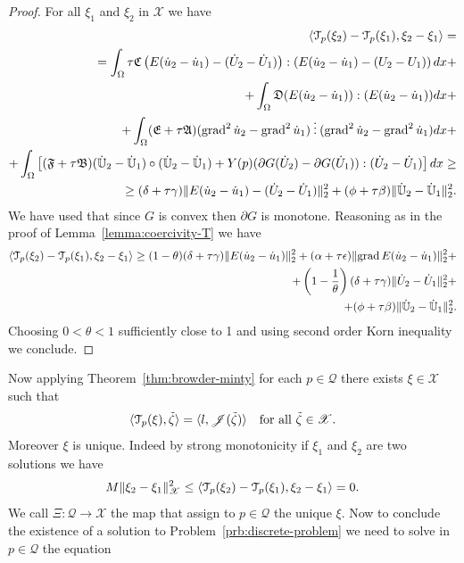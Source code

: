 \begin{proof}
For all $\xi_1$ and $\xi_2$ in $\mathscr{X}$ we have
\[
\begin{split}
\langle\mathcal{T}_p(\xi_2)-\mathcal{T}_p(\xi_1),\xi_2-\xi_1\rangle=\\
=\int_\Omega\tau\mathfrak{C}\left(E(\dot u_2-\dot u_1)-(\dot U_2-\dot U_1)\right):\left(E(\dot u_2-\dot u_1)-(U_2-U_1)\right)dx+\\
+\int_\Omega\mathfrak{D}(E(\dot u_2-\dot u_1)):(E(\dot u_2-\dot u_1))dx+\\
+\int_\Omega(\mathfrak{E}+\tau \mathfrak{A})(\operatorname{grad}^2\dot u_2-\operatorname{grad}^2\dot u_1)\mathbin{\vdots}(\operatorname{grad}^2\dot u_2-\operatorname{grad}^2\dot u_1)dx+\\
+\int_\Omega\left[(\mathfrak{F}+\tau\mathfrak{B})(\mathbb{\dot U}_2-\mathbb{\dot U}_1)\circ(\mathbb{\dot U}_2-\mathbb{\dot U}_1)+Y(p)(\partial G(\dot U_2)-\partial G(\dot U_1)):(\dot U_2-\dot U_1)\right]dx\ge\\
\ge(\delta+\tau\gamma)\lVert E(\dot u_2-\dot u_1)-(\dot U_2-\dot U_1)\rVert_2^2+(\phi+\tau\beta)\lVert\dot{\mathbb{U}}_2-\dot{\mathbb{U}}_1\rVert_2^2.
\end{split}
\]
We have used that since $G$ is convex then $\partial G$ is monotone. Reasoning as in the proof of Lemma~\ref{lemma:coercivity-T} we have
\[
\begin{split}
\langle\mathcal{T}_p(\xi_2)-\mathcal{T}_p(\xi_1),\xi_2-\xi_1\rangle\ge(1-\theta)(\delta+\tau\gamma)\lVert E(\dot u_2-\dot u_1)\rVert_2^2+(\alpha+\tau\epsilon)\lVert\operatorname{grad} E(\dot u_2-\dot u_1)\rVert_2^2+\\
+\left(1-\frac{1}{\theta}\right)(\delta+\tau\gamma)\lVert\dot U_2-\dot U_1\rVert_2^2+\\
+(\phi+\tau\beta)\lVert\dot{\mathbb{U}}_2-\dot{\mathbb{U}}_1\rVert_2^2.
\end{split}
\]
Choosing $0<\theta<1$ sufficiently close to 1 and using second order Korn inequality we conclude.
\end{proof}
Now applying Theorem~\ref{thm:browder-minty} for each $p\in\mathscr{Q}$ there exists $\xi\in\mathscr{X}$ such that
\[
\langle\mathcal{T}_p(\xi),\tilde{\zeta}\rangle=\langle l,\mathscr{J}(\tilde{\zeta})\rangle\quad\text{for all $\tilde{\zeta}\in\mathscr{X}$}.
\]
Moreover $\xi$ is unique. Indeed by strong monotonicity if $\xi_1$ and $\xi_2$ are two solutions we have
\[
M\lVert\xi_2-\xi_1\rVert_\mathscr{X}^2\le\langle\mathcal{T}_p(\xi_2)-\mathcal{T}_p(\xi_1),\xi_2-\xi_1\rangle=0.
\]
We call $\Xi\colon\mathscr{Q}\to\mathscr{X}$ the map that assign to $p\in\mathscr{Q}$ the unique $\xi$. Now to conclude the existence of a solution to Problem~\ref{prb:discrete-problem} we need to solve in $p\in\mathscr{Q}$ the equation
